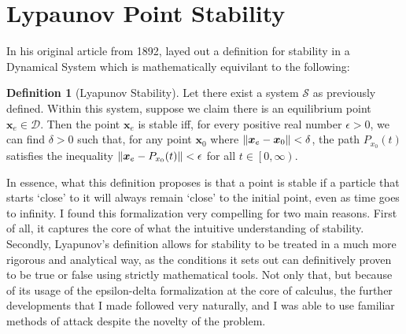\documentclass{article}
\newcommand{\B}[1]{\boldsymbol{#1}}
\DeclarePairedDelimiter\norm{\lVert}{\rVert}%
\theoremstyle{definition}
\newtheorem{definition}{Definition}[section]
\theoremstyle{remark}
\newtheorem*{remark}{Remark}
\begin{document}

\section{Lypaunov Point Stability}
In his original article from 1892, \cite{Lyapunov:1992} 
layed out a definition for stability in a Dynamical System which is mathematically equivilant to the following:
\begin{definition}[Lyapunov Stability]
  \label{Lyapunov Stability}
  Let there exist a system $\mathcal{S}$ as previously defined. Within this system, suppose
  we claim there is an equilibrium point $\B{x}_e \in \mathcal{D}$.
  Then the point $\B{x}_e$ is stable iff, for every positive real number $\epsilon > 0$, we 
  can find $\delta > 0$ such that, for any point $\B{x}_0$ where $\norm{\B{x}_e - \B{x}_0} < \delta$,
  the path $P_{x_0}(t)$ satisfies the inequality $\norm{\B{x}_e - P_{x_0}(t)} < \epsilon$
  for all $t \in \left[0, \infty \right)$.
  
\end{definition}

In essence, what this definition proposes is that a point is stable if a particle that
starts `close' to it will always remain `close' to the initial point, even as time goes 
to infinity. I found this formalization very compelling for two main reasons. First of all,
it captures the core of what the intuitive understanding of stability.
Secondly, Lyapunov's definition allows for stability to be treated in a much more rigorous and analytical
way, as the conditions it sets out can definitively proven to be true or false using strictly mathematical tools.
Not only that, but because of its usage of the epsilon-delta formalization at the core of
calculus, the further developments that I made followed very naturally, and I was able to use familiar methods of attack
despite the novelty of the problem.



 

\end{document}
